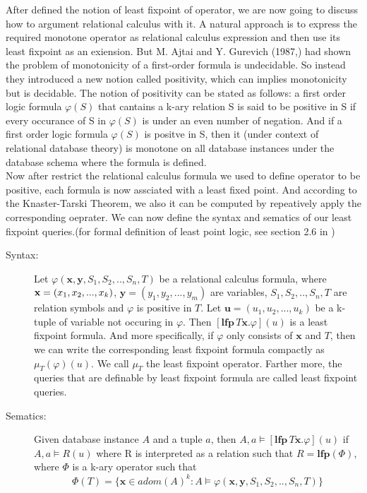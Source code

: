 After defined the notion of least fixpoint of operator, we are now going to discuss how to argument relational calculus with it. A natural approach is to express the required monotone operator as relational calculus expression and then use its least fixpoint as an exiension. But M. Ajtai and Y. Gurevich (1987,\cite{Ajtai}) had shown the problem of monotonicity of a first-order formula is undecidable. So instead they introduced a new notion called positivity, which can implies monotonicity but is decidable. The notion of positivity can be stated as follows: a first order logic formula $\varphi(S)$ that cantains a k-ary relation S is said to be positive in S if every occurance of S in $\varphi(S)$ is under an even number of negation. And if a first order logic formula $\varphi(S)$ is positve in S, then it (under context of relational database theory) is monotone on all database instances under the database schema where the formula is defined.\\ 
Now after restrict the relational calculus formula we used to define operator to be positive, each formula is now assciated with a least fixed point. And according to the Knaster-Tarski Theorem, we also it can be computed by repeatively apply the corresponding oeprater. We can now define the syntax and sematics of our least fixpoint queries.(for formal definition of least point logic, see section 2.6 in \cite{kolaitis1})\\

\begin{description}

\item[Syntax:]
Let $\varphi(\textbf{x},\textbf{y}, S_1,S_2,..,S_n, T)$ be a relational calculus formula, where $\textbf{x}=(x_1, \\x_2,...,x_k)$, $\textbf{y}=(y_1,y_2,...,y_m)$ are variables, $S_1,S_2,..,S_n, T$ are relation symbols and $\varphi$ is positive in $T$. Let $\textbf{u}=(u_1, u_2,...,u_k)$ be a k-tuple of variable not occuring in $\varphi$. Then $[\textbf{lfp}\,T\textbf{x}.\varphi](u)$ is a least fixpoint formula. And more specifically, if $\varphi$ only consists of $\textbf{x}$ and $T$, then we can write the corresponding least fixpoint formula compactly as $\mu_T(\varphi)(u)$. We call $\mu_T$ the least fixpoint operator. Farther more, the queries that are definable by least fixpoint formula are called least fixpoint queries.\\

\item[Sematics:]
Given database instance $A$ and a tuple $a$, then $A, a \models [\textbf{lfp}\,T\textbf{x}.\varphi](u)$ if $A, a \models R(u)$ where R is interpreted as a relation such that $R=\textbf{lfp}(\Phi)$, where $\Phi$ is a k-ary operator such that
$$ \Phi(T) = \{\textbf{x}\in adom(A)^k: A\models \varphi(\textbf{x},\textbf{y},S_1,S_2,..,S_n,T)\}$$ 

\end{description}

